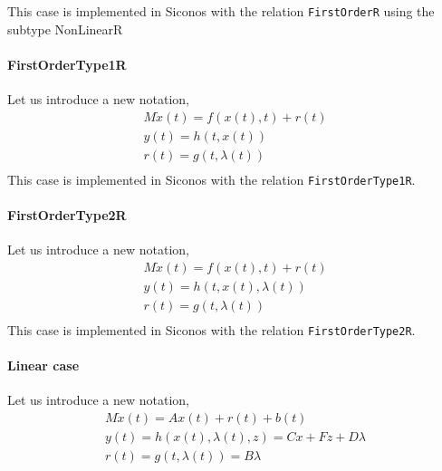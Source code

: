 This case is implemented in Siconos with the relation {\tt FirstOrderR} using the subtype {NonLinearR}

\paragraph{FirstOrderType1R}
Let us introduce a new notation,
\begin{equation}
\begin{array}{l}
M \dot{x}(t) = f(x(t),t) + r(t)  \\[2mm]
y(t) = h(t,x(t)) \\[2mm]
r(t) = g(t,\lambda (t) ) \\[2mm]
\end{array}
\label{first-DS1}
\end{equation}
This case is implemented in Siconos with the relation {\tt FirstOrderType1R}.



\paragraph{FirstOrderType2R}
Let us introduce a new notation,
\begin{equation}
\begin{array}{l}
M \dot{x}(t) = f(x(t),t) + r(t)  \\[2mm]
y(t) = h(t,x(t),\lambda (t)) \\[2mm]
r(t) = g(t,\lambda (t) ) \\[2mm]
\end{array}
\label{first-DS2}
\end{equation}
This case is implemented in Siconos with the relation {\tt FirstOrderType2R}.




\paragraph{Linear case }Let us introduce a new notation,
\begin{equation}
\begin{array}{l}
M \dot{x}(t) = Ax(t) + r(t)  +b(t)\\[2mm]
y(t) = h(x(t),\lambda (t),z) = Cx + Fz + D \lambda  \\[2mm]
r(t) = g(t,\lambda (t) ) = B \lambda \\[2mm]
\end{array}
\label{first-DS3}
\end{equation}


